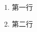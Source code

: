 \documentclass{ctexart}
\begin{document}
\begin{enumerate}[label = \chinese*、]
  \item 第一行
  \item 第二行
\end{enumerate}
\end{document}
